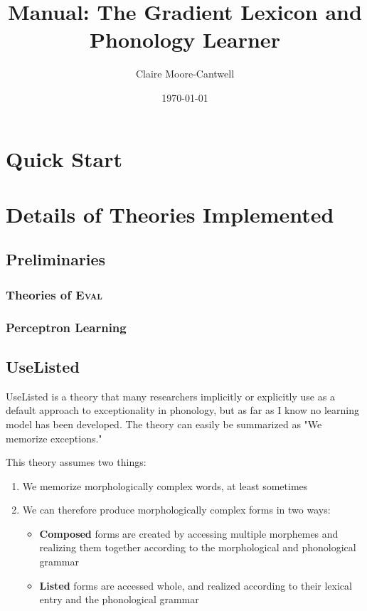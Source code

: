 \documentclass[12]{article}
\title{Manual: The Gradient Lexicon and Phonology Learner}
\author{Claire Moore-Cantwell}
\date{\today}
\begin{document}
\maketitle

\section{Quick Start}

\section{Details of Theories Implemented}
	\subsection{Preliminaries}
		\subsubsection{Theories of \textsc{Eval}}

		\subsubsection{Perceptron Learning}
	\subsection{UseListed}
		UseListed is a theory that many researchers implicitly or explicitly use as a default approach to exceptionality in phonology, but as far as I know no learning model has been developed.  The theory can easily be summarized as "We memorize exceptions."
		
		This theory assumes two things:
		\begin{enumerate}
			\item We memorize morphologically complex words, at least sometimes
			\item We can therefore produce morphologically complex forms in two ways:
			\begin{itemize}
				\item {\bf Composed} forms are created by accessing multiple morphemes and realizing them together according to the morphological and phonological grammar
				\item {\bf Listed} forms are accessed whole, and realized according to their lexical entry and the phonological grammar
			\end{itemize}
		\end{enumerate}
	
\end{document}
